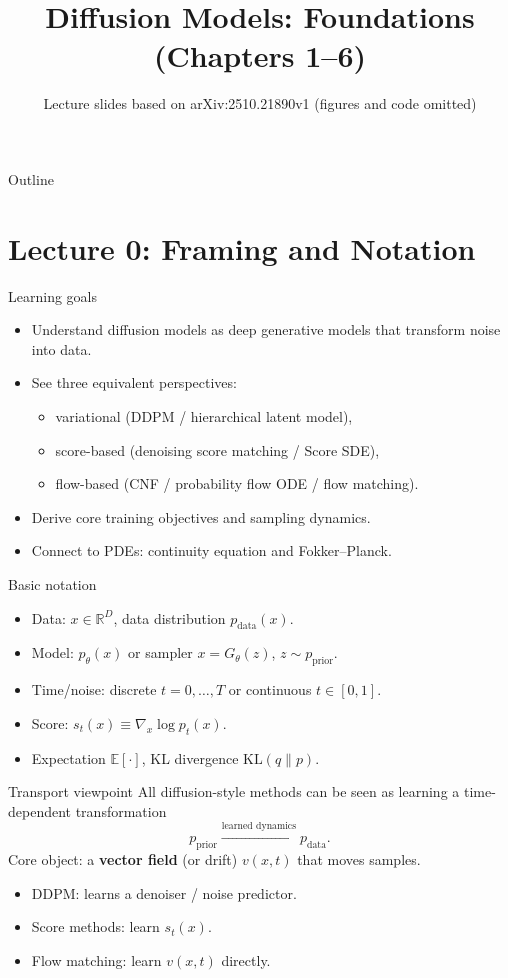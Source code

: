 \documentclass[aspectratio=169]{beamer}
\title{Diffusion Models: Foundations (Chapters 1--6)}
\subtitle{Lecture slides based on arXiv:2510.21890v1 (figures and code omitted)}
\author{}
\date{}
\begin{document}
\frame{\titlepage}

\begin{frame}{Outline}
\tableofcontents
\end{frame}

\section{Lecture 0: Framing and Notation}

\begin{frame}{Learning goals}
\begin{itemize}
\item Understand diffusion models as deep generative models that transform noise into data.
\item See three equivalent perspectives:
\begin{itemize}
\item variational (DDPM / hierarchical latent model),
\item score-based (denoising score matching / Score SDE),
\item flow-based (CNF / probability flow ODE / flow matching).
\end{itemize}
\item Derive core training objectives and sampling dynamics.
\item Connect to PDEs: continuity equation and Fokker--Planck.
\end{itemize}
\end{frame}

\begin{frame}{Basic notation}
\begin{itemize}
\item Data: \(x\in\mathbb{R}^D\), data distribution \(p_{\text{data}}(x)\).
\item Model: \(p_\theta(x)\) or sampler \(x = G_\theta(z)\), \(z\sim p_{\text{prior}}\).
\item Time/noise: discrete \(t=0,\dots,T\) or continuous \(t\in[0,1]\).
\item Score: \(s_t(x)\equiv \nabla_x \log p_t(x)\).
\item Expectation \(\mathbb{E}[\cdot]\), KL divergence \(\mathrm{KL}(q\|p)\).
\end{itemize}
\end{frame}

\begin{frame}{Transport viewpoint}
All diffusion-style methods can be seen as learning a time-dependent transformation
\[
p_{\text{prior}} \xrightarrow{\text{learned dynamics}} p_{\text{data}}.
\]
Core object: a \textbf{vector field} (or drift) \(v(x,t)\) that moves samples.
\begin{itemize}
\item DDPM: learns a denoiser / noise predictor.
\item Score methods: learn \(s_t(x)\).
\item Flow matching: learn \(v(x,t)\) directly.
\end{itemize}
\end{frame}
\end{document}
